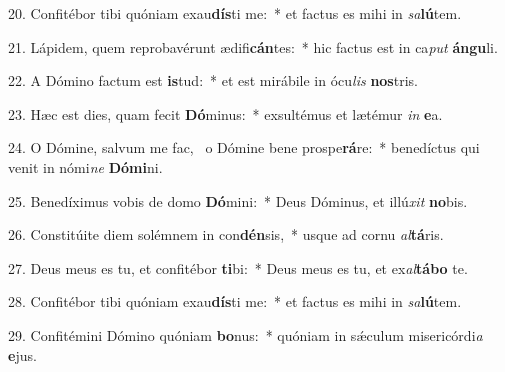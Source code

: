 20. Confitébor tibi quóniam exau\textbf{dís}ti me:~*  et factus es mihi in \textit{sa}\textbf{lú}tem.\

21. Lápidem, quem reprobavérunt ædifi\textbf{cán}tes:~*  hic factus est in ca\textit{put} \textbf{án}\textbf{gu}li.\

22. A Dómino factum est \textbf{is}tud:~*  et est mirábile in ócu\textit{lis} \textbf{nos}tris.\

23. Hæc est dies, quam fecit \textbf{Dó}minus:~*  exsultémus et lætémur \textit{in} \textbf{e}a.\

24. O Dómine, salvum me fac, \dag\  o Dómine bene prospe\textbf{rá}re:~*  benedíctus qui venit in nómi\textit{ne} \textbf{Dó}\textbf{mi}ni.\

25. Benedíximus vobis de domo \textbf{Dó}mini:~*  Deus Dóminus, et illú\textit{xit} \textbf{no}bis.\

26. Constitúite diem solémnem in con\textbf{dén}sis,~*  usque ad cornu \textit{al}\textbf{tá}ris.\

27. Deus meus es tu, et confitébor \textbf{ti}bi:~*  Deus meus es tu, et ex\textit{al}\textbf{tá}\textbf{bo} te.\

28. Confitébor tibi quóniam exau\textbf{dís}ti me:~*  et factus es mihi in \textit{sa}\textbf{lú}tem.\

29. Confitémini Dómino quóniam \textbf{bo}nus:~*  quóniam in sǽculum misericórdi\textit{a} \textbf{e}jus.\

